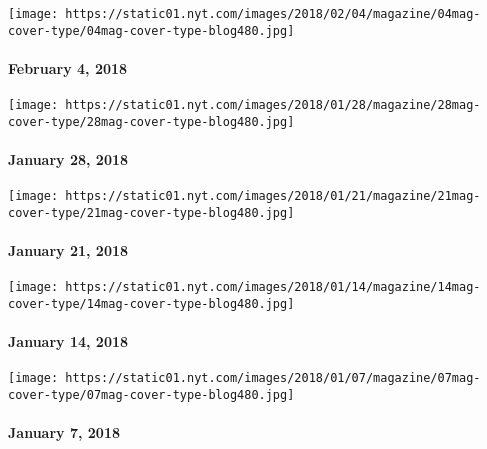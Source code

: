 \href{https://www.nytimes.com/interactive/2018/01/30/magazine/winter-olympics-alpine-skiing-lindsey-vonn-workout.html}{}

\texttt{[image: https://static01.nyt.com/images/2018/02/04/magazine/04mag-cover-type/04mag-cover-type-blog480.jpg]}

\hypertarget{february-4-2018}{%
\paragraph{February 4, 2018}\label{february-4-2018}}

\href{https://www.nytimes.com/issue/magazine/2018/02/01/12818-issue}{}

\texttt{[image: https://static01.nyt.com/images/2018/01/28/magazine/28mag-cover-type/28mag-cover-type-blog480.jpg]}

\hypertarget{january-28-2018}{%
\paragraph{January 28, 2018}\label{january-28-2018}}

\href{https://www.nytimes.com/issue/magazine/2018/01/12/12118-issue}{}

\texttt{[image: https://static01.nyt.com/images/2018/01/21/magazine/21mag-cover-type/21mag-cover-type-blog480.jpg]}

\hypertarget{january-21-2018}{%
\paragraph{January 21, 2018}\label{january-21-2018}}

\href{https://www.nytimes.com/issue/magazine/2018/01/19/11418-issue}{}

\texttt{[image: https://static01.nyt.com/images/2018/01/14/magazine/14mag-cover-type/14mag-cover-type-blog480.jpg]}

\hypertarget{january-14-2018}{%
\paragraph{January 14, 2018}\label{january-14-2018}}

\href{https://www.nytimes.com/issue/magazine/2018/01/05/10718-issue}{}

\texttt{[image: https://static01.nyt.com/images/2018/01/07/magazine/07mag-cover-type/07mag-cover-type-blog480.jpg]}

\hypertarget{january-7-2018}{%
\paragraph{January 7, 2018}\label{january-7-2018}}

